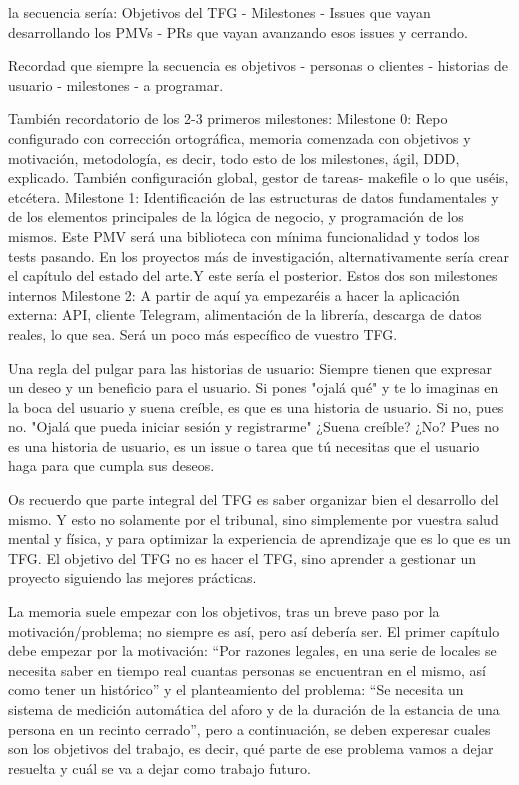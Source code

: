 la secuencia sería:
Objetivos del TFG - Milestones - Issues que vayan desarrollando los PMVs - 
PRs que vayan avanzando esos issues y cerrando.

Recordad que siempre la secuencia es objetivos - personas o clientes -
 historias de usuario - milestones - a programar.

También recordatorio de los 2-3 primeros milestones:
Milestone 0: Repo configurado con corrección ortográfica, 
memoria comenzada con objetivos y motivación, metodología, es decir, 
todo esto de los milestones, ágil, DDD, explicado. 
También configuración global, gestor de tareas- makefile o lo que uséis, 
etcétera.
Milestone 1: Identificación de las estructuras de datos 
fundamentales y de los elementos principales de la 
lógica de negocio, y programación de los mismos. 
Este PMV será una biblioteca con mínima funcionalidad 
y todos los tests pasando. En los proyectos más de 
investigación, alternativamente sería crear el capítulo 
del estado del arte.Y este sería el posterior. Estos dos 
son milestones internos
Milestone 2: A partir de aquí ya empezaréis a hacer la 
aplicación externa: API, cliente Telegram, alimentación 
de la librería, descarga de datos reales, lo que sea. 
Será un poco más específico de vuestro  TFG.

Una regla del pulgar para las historias de usuario: Siempre 
tienen que expresar un deseo y un beneficio para el usuario. 
Si pones "ojalá qué" y te lo imaginas en la boca del usuario 
y suena creíble, es que es una historia de usuario. Si no, pues no.
"Ojalá que pueda iniciar sesión y registrarme" ¿Suena creíble? ¿No? 
Pues no es una historia de usuario, es un issue o tarea que 
tú necesitas que el usuario haga para que cumpla sus deseos.

Os recuerdo que parte integral del TFG es saber organizar 
bien el desarrollo del mismo. Y esto no solamente por el tribunal, 
sino simplemente por vuestra salud mental y física, y para 
optimizar la experiencia de aprendizaje que es lo que es un 
TFG. El objetivo del TFG no es hacer el TFG, sino aprender 
a gestionar un proyecto siguiendo las mejores prácticas.

La memoria suele empezar con los objetivos, tras un breve paso 
por la motivación/problema; no siempre es así, pero 
así debería ser. El primer capítulo debe empezar por 
la motivación: “Por razones legales, en una serie de locales 
se necesita saber en tiempo real cuantas personas se encuentran 
en el mismo, así como tener un histórico” y el planteamiento 
del problema: “Se necesita un sistema de medición automática 
del aforo y de la duración de la estancia de una persona 
en un recinto cerrado”, pero a continuación, se deben 
experesar cuales son los objetivos del trabajo, es decir, 
qué parte de ese problema vamos a dejar resuelta y cuál 
se va a dejar como trabajo futuro.

